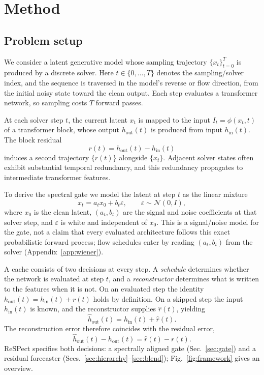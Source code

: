 \documentclass{article} %
\begin{document}
\section{Method}
\label{sec:method}

\subsection{Problem setup}
\label{sec:setup}
We consider a latent generative model whose sampling trajectory
$\{x_t\}_{t=0}^{T}$ is produced by a discrete solver. Here
$t \in \{0,\ldots,T\}$ denotes the sampling/solver index, and the
sequence is traversed in the model's reverse or flow direction, from the
initial noisy state toward the clean output. Each step evaluates a
transformer network, so sampling costs $T$ forward passes.

At each solver step $t$, the current latent $x_t$ is mapped to the
input $I_t = \phi(x_t, t)$ of a transformer block, whose output
$h_{\mathrm{out}}(t)$ is produced from input $h_{\mathrm{in}}(t)$. The
block residual
\begin{equation}
  r(t) = h_{\mathrm{out}}(t) - h_{\mathrm{in}}(t)
\end{equation}
induces a second trajectory $\{r(t)\}$ alongside $\{x_t\}$. Adjacent
solver states often exhibit substantial temporal redundancy, and this
redundancy propagates to intermediate transformer features.

To derive the spectral gate we model the latent at step $t$ as the
linear mixture
\begin{equation}
  x_t = a_t x_0 + b_t \varepsilon, \qquad
  \varepsilon \sim \mathcal{N}(0, I),
\end{equation}
where $x_0$ is the clean latent, $(a_t, b_t)$ are the signal and noise
coefficients at that solver step, and $\varepsilon$ is white and
independent of $x_0$. This is a signal/noise model for the gate, not a
claim that every evaluated architecture follows this exact probabilistic
forward process; flow schedules enter by reading $(a_t, b_t)$ from the
solver (Appendix~\ref{app:wiener}).

A cache consists of two decisions at every step. A \emph{schedule}
determines whether the network is evaluated at step $t$, and a
\emph{reconstructor} determines what is written to the features when it
is not. On an evaluated step the identity
$h_{\mathrm{out}}(t) = h_{\mathrm{in}}(t) + r(t)$ holds by definition.
On a skipped step the input $h_{\mathrm{in}}(t)$ is known, and the
reconstructor supplies $\hat{r}(t)$, yielding
\begin{equation}
  \hat{h}_{\mathrm{out}}(t) = h_{\mathrm{in}}(t) + \hat{r}(t).
\end{equation}
The reconstruction error therefore coincides with the residual error,
\begin{equation}
  \hat{h}_{\mathrm{out}}(t) - h_{\mathrm{out}}(t)
  = \hat{r}(t) - r(t).
\end{equation}
ReSPect specifies both decisions: a spectrally aligned gate
(Sec.~\ref{sec:gate}) and a residual forecaster
(Secs.~\ref{sec:hierarchy}--\ref{sec:blend});
Fig.~\ref{fig:framework} gives an overview.
\end{document}
